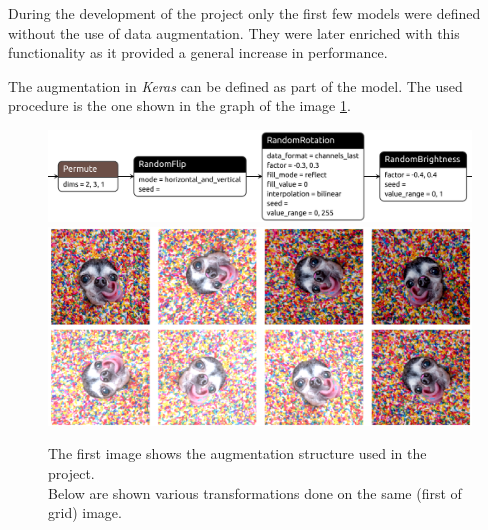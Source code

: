 
During the development of the project only the first few models were defined without the use of data augmentation.
They were later enriched with this functionality as it provided a general increase in performance.

The augmentation in \textit{Keras} can be defined as part of the model. The used procedure is the one shown in the graph of the image \ref{fig:custom_aug_proc}.

\begin{figure}[h]
    \centering
    \includegraphics[scale=0.3]{imgs/augmentation_only_model_structure}\\
    \includegraphics[scale=0.4]{imgs/aug_example_rew}
    \caption{
        The first image shows the augmentation structure used in the project.\\
        Below are shown various transformations done on the same (first of grid) image.
    }\label{fig:custom_aug_proc}
\end{figure}


